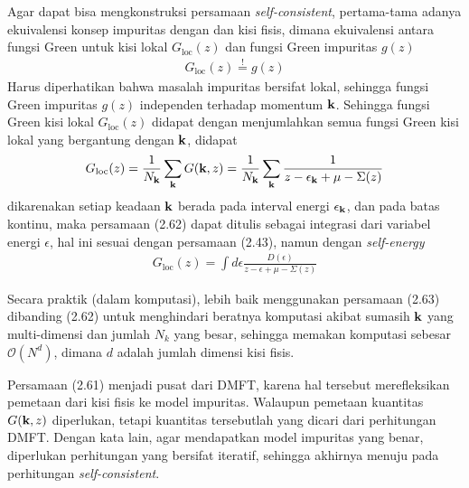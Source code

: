 Agar dapat bisa mengkonstruksi persamaan \textit{self-consistent}, pertama-tama adanya ekuivalensi konsep impuritas dengan dan kisi fisis, dimana ekuivalensi antara fungsi Green untuk kisi lokal $G_{\text{loc}}(z)$ dan fungsi Green impuritas $g(z)$
\begin{align}
G_{\text{loc}}(z) \stackrel{!}{=} g(z)
\end{align}
Harus diperhatikan bahwa masalah impuritas bersifat lokal, sehingga fungsi Green impuritas $g(z)$ independen terhadap momentum $\textbf{k}$. Sehingga fungsi Green kisi lokal $G_{\text{loc}}(z)$ didapat dengan menjumlahkan semua fungsi Green kisi lokal yang bergantung dengan $\textbf{k}$, didapat
\begin{align}
G_{\text{loc}}(z) = \frac{1}{N_{\textbf{k}}} \sum_{\textbf{k}} G(\textbf{k},z) = \frac{1}{N_{\textbf{k}}} \sum_{\textbf{k}} \frac{1}{z - \epsilon_{\textbf{k}} + \mu - \Sigma(z)}
\end{align}
dikarenakan setiap keadaan $\textbf{k}$ berada pada interval energi $\epsilon_{\textbf{k}}$, dan pada batas kontinu, maka persamaan (2.62) dapat ditulis sebagai integrasi dari variabel energi $\epsilon$, hal ini sesuai dengan persamaan (2.43), namun dengan \textit{self-energy}
\begin{align}
G_{\text{loc}}(z) = \int d\epsilon \frac{D(\epsilon)}{z - \epsilon + \mu - \Sigma(z)}
\end{align}

Secara praktik (dalam komputasi), lebih baik menggunakan persamaan (2.63) dibanding (2.62) untuk menghindari beratnya komputasi akibat sumasih $\textbf{k}$ yang multi-dimensi dan jumlah $N_k$ yang besar, sehingga memakan komputasi sebesar $\mathcal{O}(N^d)$, dimana $d$ adalah jumlah dimensi kisi fisis.

Persamaan (2.61) menjadi pusat dari DMFT, karena hal tersebut merefleksikan pemetaan dari kisi fisis ke model impuritas. Walaupun pemetaan kuantitas $G(\textbf{k},z)$ diperlukan, tetapi kuantitas tersebutlah yang dicari dari perhitungan DMFT. Dengan kata lain, agar mendapatkan model impuritas yang benar, diperlukan perhitungan yang bersifat iteratif, sehingga akhirnya menuju pada perhitungan \textit{self-consistent}.

